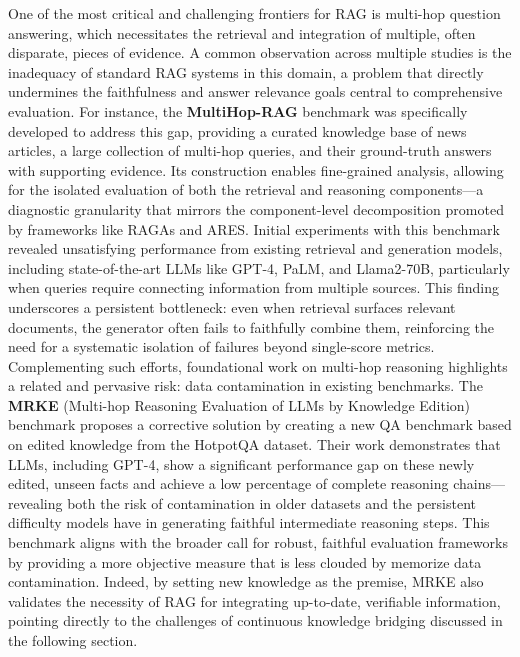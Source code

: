 \documentclass[11pt]{article}
\begin{document}
One of the most critical and challenging frontiers for RAG is multi-hop question answering, which necessitates the retrieval and integration of multiple, often disparate, pieces of evidence. A common observation across multiple studies is the inadequacy of standard RAG systems in this domain, a problem that directly undermines the faithfulness and answer relevance goals central to comprehensive evaluation. For instance, the \textbf{MultiHop-RAG} benchmark \cite{ref49} was specifically developed to address this gap, providing a curated knowledge base of news articles, a large collection of multi-hop queries, and their ground-truth answers with supporting evidence. Its construction enables fine-grained analysis, allowing for the isolated evaluation of both the retrieval and reasoning components---a diagnostic granularity that mirrors the component-level decomposition promoted by frameworks like RAGAs and ARES. Initial experiments with this benchmark revealed unsatisfying performance from existing retrieval and generation models, including state-of-the-art LLMs like GPT-4, PaLM, and Llama2-70B, particularly when queries require connecting information from multiple sources. This finding underscores a persistent bottleneck: even when retrieval surfaces relevant documents, the generator often fails to faithfully combine them, reinforcing the need for a systematic isolation of failures beyond single-score metrics. Complementing such efforts, foundational work on multi-hop reasoning highlights a related and pervasive risk: data contamination in existing benchmarks. The \textbf{MRKE} (Multi-hop Reasoning Evaluation of LLMs by Knowledge Edition) benchmark \cite{ref416} proposes a corrective solution by creating a new QA benchmark based on edited knowledge from the HotpotQA dataset. Their work demonstrates that LLMs, including GPT-4, show a significant performance gap on these newly edited, unseen facts and achieve a low percentage of complete reasoning chains---revealing both the risk of contamination in older datasets and the persistent difficulty models have in generating faithful intermediate reasoning steps. This benchmark aligns with the broader call for robust, faithful evaluation frameworks by providing a more objective measure that is less clouded by memorize data contamination. Indeed, by setting new knowledge as the premise, MRKE also validates the necessity of RAG for integrating up-to-date, verifiable information, pointing directly to the challenges of continuous knowledge bridging discussed in the following section.
\end{document}
